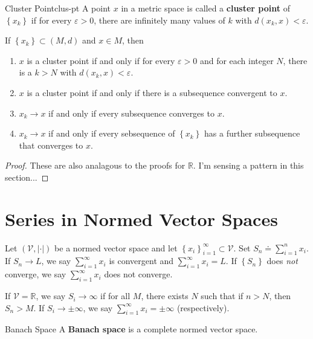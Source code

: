 \documentclass[10pt]{report}
\begin{document}
\begin{defn}{Cluster Point}{clus-pt}
	A point $x$ in a metric space is called a \textbf{cluster point} of $\left\{ x_k \right\}$ if for every $\varepsilon>0$, there are infinitely many values of $k$ with $d(x_k,x)<\varepsilon$.
\end{defn}

\begin{prop}
	If $\left\{ x_k \right\}\subset (M,d)$ and $x \in M$, then
	\begin{enumerate}
		\item $x$ is a cluster point if and only if for every $\varepsilon>0$ and for each integer $N$, there is a $k >N$ with $d(x_k,x) < \varepsilon$.
		\item $x$ is a cluster point if and only if there is a subsequence convergent to $x$.
		\item $x_k \to x$ if and only if every subsequence converges to $x$.
		\item $x_k \to x$ if and only if every sebsequence of $\left\{ x_k \right\}$ has a further subsequence that converges to $x$.
	\end{enumerate}
\end{prop}
\begin{proof}
	These are also analagous to the proofs for $\mathbb{R}$. I'm sensing a pattern in this section...
\end{proof}



\section{Series in Normed Vector Spaces}

Let $(\mathcal{V},|\cdot|)$ be a normed vector space and let $\left\{ x_i \right\}_{i=1}^\infty\subset \mathcal{V}$. Set $S_n \doteq \sum_{i=1}^{n} x_i$. If $S_n \to L$, we say $\sum_{i=1}^{\infty} x_i$ is convergent and $\sum_{i=1}^{\infty} x_i = L$. If $\left\{ S_n \right\}$ does \textit{not} converge, we say $\sum_{i=1}^{\infty} x_i$ does not converge.

If $\mathcal{V}=\mathbb{R}$, we say $S_i \to \infty$ if for all $M$, there exists $N$ such that if $n  >N$, then $S_n > M$. If $S_i \to \pm \infty$, we say $\sum_{i=1}^{\infty} x_i = \pm\infty$ (respectively).

\begin{defn}{Banach Space}{}
A \textbf{Banach space} is a complete normed vector space.
\end{defn}
\end{document}
